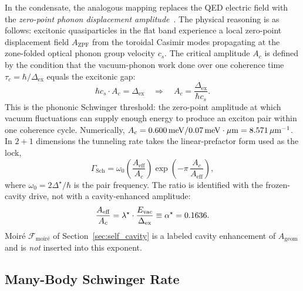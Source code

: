 \documentclass[11pt,letterpaper]{article}
\begin{document}
In the \TEVC{} condensate, the analogous mapping replaces the QED electric field with the \textit{zero-point phonon displacement amplitude}~\cite{Schmitt2023}. The physical reasoning is as follows: excitonic quasiparticles in the flat band experience a local zero-point displacement field $A_{\text{ZPF}}$ from the toroidal Casimir modes propagating at the zone-folded optical phonon group velocity $c_s$. The critical amplitude $A_c$ is defined by the condition that the vacuum-phonon work done over one coherence time $\tau_c = \hbar/\Delta_{\text{ex}}$ equals the excitonic gap:
\begin{equation}
\hbar c_s \cdot A_c = \Delta_{\text{ex}} \quad \Longrightarrow \quad A_c = \frac{\Delta_{\text{ex}}}{\hbar c_s}.
\label{eq:Ac_schwinger}
\end{equation}
This is the phononic Schwinger threshold: the zero-point amplitude at which vacuum fluctuations can supply enough energy to produce an exciton pair within one coherence cycle. Numerically, $A_c = 0.600\,\mathrm{meV} / 0.07\,\mathrm{meV\cdot\mu m} = 8.571\,\mu\mathrm{m}^{-1}$. In $2{+}1$ dimensions the tunneling rate takes the linear-prefactor form used as the lock,
\begin{equation}
\Gamma_{\text{Sch}} = \omega_0 \left(\frac{A_{\text{eff}}}{A_c}\right) \exp\!\left(-\pi\,\frac{A_c}{A_{\text{eff}}}\right),
\end{equation}
where $\omega_0 = 2\Delta^\star/\hbar$ is the pair frequency. The ratio is identified with the frozen-cavity drive, not with a cavity-enhanced amplitude:
\begin{equation}
\frac{A_{\text{eff}}}{A_c} = \lambda^\star \cdot \frac{E_{\text{vac}}}{\Delta_{\text{ex}}} \equiv \alpha^\star = 0.1636.
\label{eq:schwinger_bridge}
\end{equation}
Moiré $\mathcal{F}_{\text{moir\'{e}}}$ of Section~\ref{sec:self_cavity} is a labeled cavity enhancement of $A_{\mathrm{geom}}$ and is \emph{not} inserted into this exponent.

\subsection{Many-Body Schwinger Rate}
\end{document}
